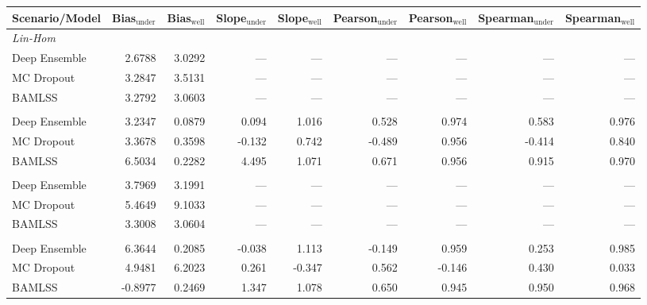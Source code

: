 \begin{tabular}{lrrrrrrrr}
\toprule
Scenario/Model & Bias$_{\text{under}}$ & Bias$_{\text{well}}$ & Slope$_{\text{under}}$ & Slope$_{\text{well}}$ & Pearson$_{\text{under}}$ & Pearson$_{\text{well}}$ & Spearman$_{\text{under}}$ & Spearman$_{\text{well}}$ \\
\midrule
\multicolumn{9}{l}{\textit{Lin-Hom}} \\
Deep Ensemble & 2.6788 & 3.0292 & --- & --- & --- & --- & --- & --- \\
MC Dropout & 3.2847 & 3.5131 & --- & --- & --- & --- & --- & --- \\
BAMLSS & 3.2792 & 3.0603 & --- & --- & --- & --- & --- & --- \\
\addlinespace
\multicolumn{9}{l}{\textit{Lin-Het}} \\
Deep Ensemble & 3.2347 & 0.0879 & 0.094 & 1.016 & 0.528 & 0.974 & 0.583 & 0.976 \\
MC Dropout & 3.3678 & 0.3598 & -0.132 & 0.742 & -0.489 & 0.956 & -0.414 & 0.840 \\
BAMLSS & 6.5034 & 0.2282 & 4.495 & 1.071 & 0.671 & 0.956 & 0.915 & 0.970 \\
\addlinespace
\multicolumn{9}{l}{\textit{Sin-Hom}} \\
Deep Ensemble & 3.7969 & 3.1991 & --- & --- & --- & --- & --- & --- \\
MC Dropout & 5.4649 & 9.1033 & --- & --- & --- & --- & --- & --- \\
BAMLSS & 3.3008 & 3.0604 & --- & --- & --- & --- & --- & --- \\
\addlinespace
\multicolumn{9}{l}{\textit{Sin-Het}} \\
Deep Ensemble & 6.3644 & 0.2085 & -0.038 & 1.113 & -0.149 & 0.959 & 0.253 & 0.985 \\
MC Dropout & 4.9481 & 6.2023 & 0.261 & -0.347 & 0.562 & -0.146 & 0.430 & 0.033 \\
BAMLSS & -0.8977 & 0.2469 & 1.347 & 1.078 & 0.650 & 0.945 & 0.950 & 0.968 \\
\bottomrule
\end{tabular}
